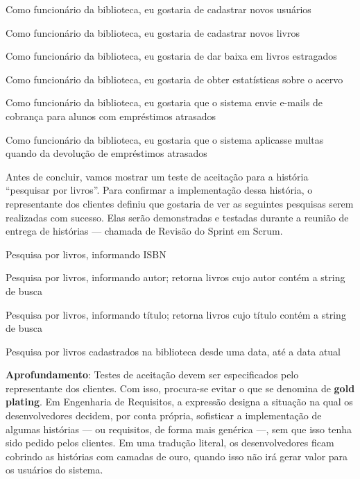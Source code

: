 \documentclass[
  11pt,
  twoside]{book}
\renewenvironment{quote}{\centering \vspace{1.5ex} \begin{tcolorbox}[colback=backcolor, width=4.9in]}{\end{tcolorbox}}
\newenvironment{esmbox}{\centering \vspace{1.5ex} \begin{tcolorbox}[breakable, colback=backcolor, width=4.9in]}{\end{tcolorbox} \vspace{1.5ex}}
\begin{document}
\begin{quote}
Como funcionário da biblioteca, eu gostaria de cadastrar novos usuários

Como funcionário da biblioteca, eu gostaria de cadastrar novos livros

Como funcionário da biblioteca, eu gostaria de dar baixa em livros
estragados

Como funcionário da biblioteca, eu gostaria de obter estatísticas sobre
o acervo

Como funcionário da biblioteca, eu gostaria que o sistema envie e-mails
de cobrança para alunos com empréstimos atrasados

Como funcionário da biblioteca, eu gostaria que o sistema aplicasse
multas quando da devolução de empréstimos atrasados
\end{quote}

Antes de concluir, vamos mostrar um teste de aceitação para a história
``pesquisar por livros''. Para confirmar a implementação dessa história,
o representante dos clientes definiu que gostaria de ver as seguintes
pesquisas serem realizadas com sucesso. Elas serão demonstradas e
testadas durante a reunião de entrega de histórias --- chamada de
Revisão do Sprint em Scrum.

\begin{quote}
Pesquisa por livros, informando ISBN

Pesquisa por livros, informando autor; retorna livros cujo autor contém
a string de busca

Pesquisa por livros, informando título; retorna livros cujo título
contém a string de busca

Pesquisa por livros cadastrados na biblioteca desde uma data, até a data
atual
\end{quote}


\begin{esmbox}

\textbf{Aprofundamento}: Testes de aceitação devem ser especificados
pelo representante dos clientes. Com isso, procura-se evitar o que se
denomina de \textbf{gold plating}. Em Engenharia de Requisitos, a
expressão designa a situação na qual os desenvolvedores decidem, por
conta própria, sofisticar a implementação de algumas histórias --- ou
requisitos, de forma mais genérica ---, sem que isso tenha sido pedido
pelos clientes. Em uma tradução literal, os desenvolvedores ficam
cobrindo as histórias com camadas de ouro, quando isso não irá gerar
valor para os usuários do sistema.

\end{esmbox}
\end{document}
